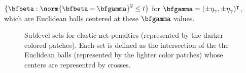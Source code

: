 $\{\bfbeta : \norm{\bfbeta - \bfgamma}^2 \leq t\}$ for $\bfgamma=(\pm
\eta_\gamma, \pm \eta_\gamma)^\intercal$, which are Euclidean balls centered at
these $\bfgamma$ values.
%
\begin{figure}
  \begin{center} 
    \caption{Sublevel sets for elastic net penalties (represented by the darker
             colored patches).  
             Each set is defined as the intersection of the the Euclidean balls
             (represented by the lighter color patches) whose centers are
             represented by crosses.}
    \label{fig:en-penalty}
    \end{center} 
\end{figure}

